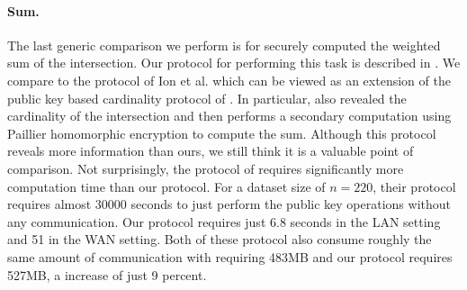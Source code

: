 \paragraph{Sum. } The last generic comparison we perform is for securely computed the weighted sum of the intersection. Our protocol for performing this task is described in . We compare to the protocol of Ion et al. \cite{cryptoeprint:2017:738} which can be viewed as an extension of the public key based cardinality protocol of \cite{DBLP:conf/cans/CristofaroGT12}. In particular, \cite{cryptoeprint:2017:738}  also revealed the cardinality of the intersection and then performs a secondary computation using Paillier homomorphic encryption to compute the sum. Although this protocol reveals more information than ours, we still think it is a valuable point of comparison. Not surprisingly,  the protocol of \cite{cryptoeprint:2017:738} requires significantly more computation time than our protocol. For a dataset size of $n=2{20}$, their protocol requires almost 30000 seconds to just perform the public key operations without any communication. Our protocol requires just 6.8 seconds in the LAN setting and 51 in the WAN setting. Both of these protocol also consume roughly the same amount of communication with \cite{cryptoeprint:2017:738} requiring 483MB and our protocol requires 527MB, a increase of just 9 percent. 

